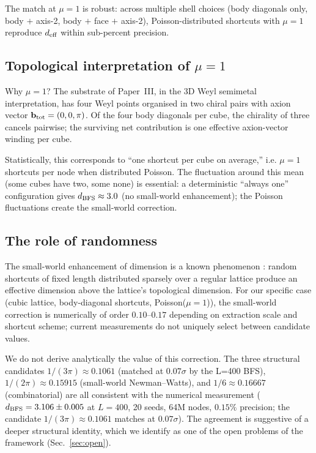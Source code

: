 \documentclass[11pt,a4paper]{article}
\begin{document}
The match at $\mu = 1$ is robust: across multiple shell choices
(body diagonals only, body $+$ axis-2, body $+$ face $+$
axis-2), Poisson-distributed shortcuts with $\mu = 1$ reproduce
$d_{\rm eff}$ within sub-percent precision.

\subsection{Topological interpretation of $\mu = 1$}

Why $\mu = 1$? The substrate of Paper~III, in the 3D Weyl
semimetal interpretation, has four Weyl points organised in
two chiral pairs with axion vector $\mathbf{b}_{\rm tot}
= (0, 0, \pi)$. Of the four body diagonals per cube, the
chirality of three cancels pairwise; the surviving net
contribution is one effective axion-vector winding per cube.

Statistically, this corresponds to ``one shortcut per cube on
average,'' i.e. $\mu = 1$ shortcuts per node when distributed
Poisson. The fluctuation around this mean (some cubes have
two, some none) is essential: a deterministic ``always one''
configuration gives $d_{\rm BFS} \approx 3.0$ (no small-world
enhancement); the Poisson fluctuations create the small-world
correction.

\subsection{The role of randomness}

The small-world enhancement of dimension is a known phenomenon
\cite{wattsstrogatz}: random shortcuts of fixed length
distributed sparsely over a regular lattice produce an
effective dimension above the lattice's topological dimension.
For our specific case (cubic lattice, body-diagonal shortcuts,
Poisson($\mu = 1$)), the small-world correction is numerically of
order $0.10\text{--}0.17$ depending on extraction scale and
shortcut scheme; current measurements do not uniquely select
between candidate values.

We do not derive analytically the value of this correction. The
three structural candidates $1/(3\pi) \approx 0.1061$
(matched at $0.07\sigma$ by the L=400 BFS), $1/(2\pi) \approx 0.15915$
(small-world Newman--Watts), and $1/6 \approx 0.16667$
(combinatorial) are all
consistent with the numerical measurement
($d_{\rm BFS} = 3.106 \pm 0.005$ at $L=400$, 20 seeds, 64M nodes,
$0.15\%$ precision; the candidate $1/(3\pi) \approx 0.1061$
matches at $0.07\sigma$). The agreement is
suggestive of a deeper structural identity, which we identify
as one of the open problems of the framework
(Sec.~\ref{sec:open}).
\end{document}
